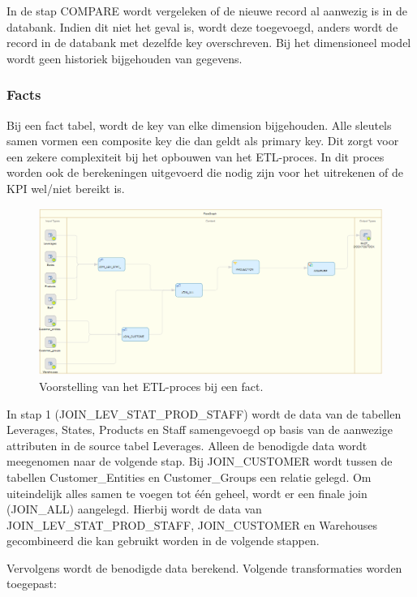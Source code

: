 In de stap COMPARE wordt vergeleken of de nieuwe record al aanwezig is in de databank. Indien dit niet het geval is, wordt deze toegevoegd, anders wordt de record in de databank met dezelfde key overschreven. Bij het dimensioneel model wordt geen historiek bijgehouden van gegevens.

\subsubsection{Facts}
Bij een fact tabel, wordt de key van elke dimension bijgehouden. Alle sleutels samen vormen een composite key die dan geldt als primary key. Dit zorgt voor een zekere complexiteit bij het opbouwen van het ETL-proces. In dit proces worden ook de berekeningen uitgevoerd die nodig zijn voor het uitrekenen of de KPI wel/niet bereikt is.

\begin{figure}[h]
	\centering
	\includegraphics[scale=0.5]{../images/DM_FG_fact.png}
	\caption{Voorstelling van het ETL-proces bij een fact.}
	\label{fig:DM_FG_fac}
\end{figure}

In stap 1 (JOIN\_LEV\_STAT\_PROD\_STAFF) wordt de data van de tabellen Leverages, States, Products en Staff samengevoegd op basis van de aanwezige attributen in de source tabel Leverages. Alleen de benodigde data wordt meegenomen naar de volgende stap. Bij JOIN\_CUSTOMER wordt tussen de tabellen Customer\_Entities en Customer\_Groups een relatie gelegd. Om uiteindelijk alles samen te voegen tot één geheel, wordt er een finale join (JOIN\_ALL) aangelegd. Hierbij wordt de data van JOIN\_LEV\_STAT\_PROD\_STAFF, JOIN\_CUSTOMER en Warehouses gecombineerd die kan gebruikt worden in de volgende stappen.

Vervolgens wordt de benodigde data berekend. Volgende transformaties worden toegepast:

